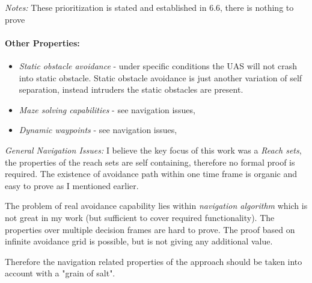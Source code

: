 \noindent \emph{Notes:} These prioritization is stated and established in 6.6, there is nothing to prove

\paragraph{Other Properties:}
\begin{itemize}
    \item \emph{Static obstacle avoidance} - under specific conditions the UAS will not crash into static obstacle. Static obstacle avoidance is just another variation of self separation, instead intruders the static obstacles are present. 
    
    \item \emph{Maze solving capabilities} - see navigation issues,
    
    \item \emph{Dynamic waypoints} - see navigation issues,
\end{itemize}

\emph{General Navigation Issues:} I believe the key focus of this work was a \emph{Reach sets}, the properties of the reach sets are self containing, therefore no formal proof is required. The existence of avoidance path within one time frame is organic and easy to prove as I mentioned earlier.

The problem of real avoidance capability lies within \emph{navigation algorithm} which is not great in my work (but sufficient to cover required functionality). The properties over multiple decision frames are hard to prove. The proof based on infinite avoidance grid is possible, but is not giving any additional value.

Therefore the navigation related properties of the approach should be taken into account with a "grain of salt".
